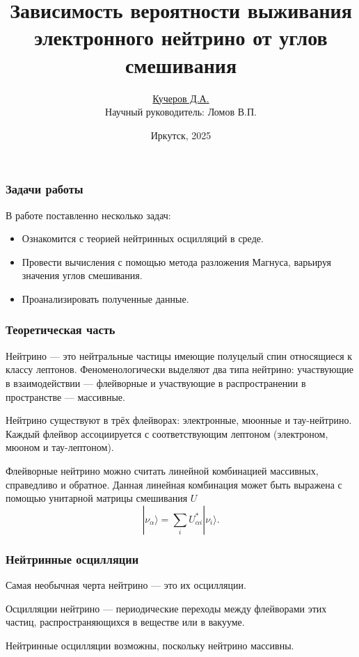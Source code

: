\documentclass[utf8,9pt,mathserif,usepdftitle=false]{beamer}
\title{Зависимость вероятности выживания электронного нейтрино от углов
  смешивания}%
\author{\underline{Кучеров Д.А.}\\[7em]\raggedleft\footnotesize Научный руководитель:
  Ломов В.П.\\%
}%
\date[ИГУ, 2025]{\vfill%
  \small{}Иркутск, 2025}
\begin{document}
\begin{frame}
  \titlepage
\end{frame}

\begin{frame}
	\frametitle{Задачи работы}
  В работе поставленно несколько задач:
  \begin{itemize}
  \item<2-> Ознакомится с теорией нейтринных осцилляций в среде.
  \item<3-> Провести вычисления с помощью метода разложения Магнуса, варьируя
    значения углов смешивания.
  \item<4-> Проанализировать полученные данные.
  \end{itemize}
\end{frame}

\begin{frame}
	\frametitle{Теоретическая часть}%
  Нейтрино — это нейтральные частицы имеющие полуцелый спин относящиеся к классу
  лептонов. Феноменологически выделяют два типа нейтрино: участвующие в
  взаимодействии — флейворные и участвующие в распространении в пространстве —
  массивные.

	Нейтрино существуют в трёх флейворах: электронные, мюонные и
  тау-нейтрино. Каждый флейвор ассоциируется с соответствующим лептоном
  (электроном, мюоном и тау-лептоном).

  Флейворные нейтрино можно считать линейной комбинацией массивных, справедливо и 
  обратное. Данная линейная комбинация может быть выражена с помощью унитарной
  матрицы смешивания \(U\)
  \begin{equation}
  	|\nu_{\alpha}\rangle=\sum_{i}U_{\alpha i}^{*}|\nu_{i}\rangle.
  \end{equation}

\end{frame}

\begin{frame}
	\frametitle{Нейтринные осцилляции}%
	Самая необычная черта нейтрино — это их осцилляции.

  Осцилляции нейтрино — периодические переходы между флейворами этих частиц,
  распространяющихся в веществе или в вакууме.

  Нейтринные осцилляции возможны, поскольку нейтрино массивны.%
\end{frame}
\end{document}
